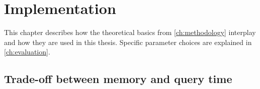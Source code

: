 \chapter{Implementation}\label{ch:implementation}

This chapter describes how the theoretical basics from \autoref{ch:methodology} interplay and how they are used in this thesis.
Specific parameter choices are explained in \autoref{ch:evaluation}.




























\section{Trade-off between memory and query time}\label{sec:trade-off}